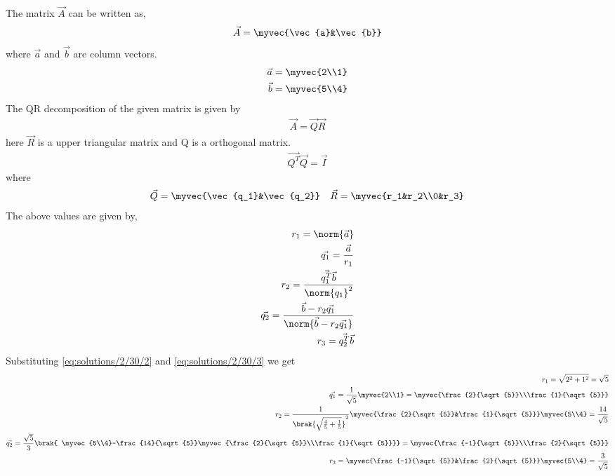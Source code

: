 The matrix $\vec{A}$ can be written as,
\begin{align}
\vec{A}=\myvec{\vec{a}&\vec{b}}
\end{align}
where $\vec{a}$ and $\vec{b}$ are column vectors. 
\begin{align}
\vec{a}=\myvec{2\\1}\label{eq:solutions/2/30/2}\\
\vec{b}=\myvec{5\\4}\label{eq:solutions/2/30/3}
\end{align}
The QR decomposition of the given matrix is given by
\begin{align}
\vec{A}=\vec{Q}\vec{R} \label{eq:solutions/2/30/4}
\end{align}
here $\vec{R}$ is a upper triangular matrix and Q is a orthogonal matrix.
\begin{align}
\vec{Q^T}\vec{Q}=\vec{I}
\end{align}
where
\begin{align}
\vec{Q}=\myvec{\vec{q_1}&\vec{q_2}}\quad
\vec{R}=\myvec{r_1&r_2\\0&r_3} \label{eq:solutions/2/30/5}
\end{align}
The above values are given by,
\begin{align}
r_1 = \norm{\vec{a}}\\
\vec{q_1}=\frac{\vec{a}}{r_1}\\
r_2 = \frac{\vec{q_1^T}\vec{b}}{\norm{q_1}^2}\\
\vec{q_2}=\frac{\vec{b}-r_2\vec{q_1}}{\norm{\vec{b}-r_2\vec{q_1}}}\\
r_3 = \vec{q_2^T}\vec{b}
\end{align}
Substituting \eqref{eq:solutions/2/30/2} and \eqref{eq:solutions/2/30/3} we get
\begin{align}
r_1= \sqrt{2^2+1^2}= \sqrt{5}\\
\vec{q_1}= \frac{1}{\sqrt{5}}\myvec{2\\1}=\myvec{\frac{2}{\sqrt{5}}\\\frac{1}{\sqrt{5}}}\\
r_2=\frac{1}{\brak{\sqrt{\frac{4}{5}+\frac{1}{5}}}^2}\myvec{\frac{2}{\sqrt{5}}&\frac{1}{\sqrt{5}}}\myvec{5\\4}= \frac{14}{\sqrt{5}}\\
\vec{q_2}=\frac{\sqrt{5}}{3}\brak{ \myvec{5\\4}-\frac{14}{\sqrt{5}}\myvec{\frac{2}{\sqrt{5}}\\\frac{1}{\sqrt{5}}}}= \myvec{\frac{-1}{\sqrt{5}}\\\frac{2}{\sqrt{5}}}\\
r_3 = \myvec{\frac{-1}{\sqrt{5}}&\frac{2}{\sqrt{5}}}\myvec{5\\4}= \frac{3}{\sqrt{5}}
\end{align}
